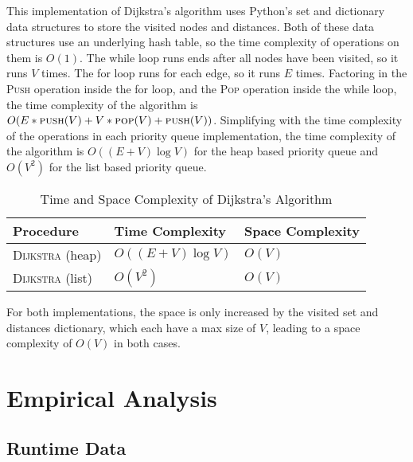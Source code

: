 \documentclass[12pt]{article}
\begin{document}
This implementation of Dijkstra's algorithm uses Python's set and dictionary data
structures to store the visited nodes and distances. Both of these data structures
use an underlying hash table, so the time complexity of operations on them is
$O(1)$. The while loop runs ends after all nodes have been visited, so it runs
$V$ times. The for loop runs for each edge, so it runs $E$ times. Factoring in
the \textsc{Push} operation inside the for loop, and the \textsc{Pop} operation
inside the while loop, the time complexity of the algorithm is $O(E * \textsc{push}(V)
 + V * \textsc{pop}(V) + \textsc{push}(V))$. Simplifying with the time complexity
of the operations in each priority queue implementation, the time complexity of
the algorithm is $O((E+V)\log V)$ for the heap based priority queue and $O(V^2)$
for the list based priority queue.

\begin{table}[h!]
    \centering
    \begin{threeparttable}
        \caption{Time and Space Complexity of Dijkstra's Algorithm}
        \begin{tabular}{@{}lll@{}}
            \toprule
            \textbf{Procedure} & \textbf{Time Complexity} & \textbf{Space Complexity} \\ \midrule
            \textsc{Dijkstra} (heap)  & $O((E+V)\log V)$        & $O(V)$                    \\
            \textsc{Dijkstra} (list)  & $O(V^2)$                & $O(V)$                    \\
            \bottomrule
        \end{tabular}
    \end{threeparttable}
\end{table}

For both implementations, the space is only increased by the visited set and
distances dictionary, which each have a max size of $V$, leading to a space
complexity of $O(V)$ in both cases. 

\section{Empirical Analysis}

\subsection{Runtime Data}
\end{document}

